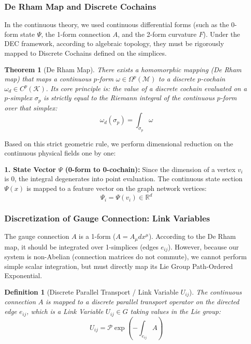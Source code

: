 \documentclass{article}
\newtheorem{definition}{Definition}[section]
\newtheorem{theorem}{Theorem}[section]
\begin{document}
\subsubsection{De Rham Map and Discrete Cochains}

In the continuous theory, we used continuous differential forms (such as the 0-form state $\Psi$, the 1-form connection $A$, and the 2-form curvature $F$). Under the DEC framework, according to algebraic topology, they must be rigorously mapped to Discrete Cochains defined on the simplices.

\begin{theorem}[De Rham Map]
There exists a homomorphic mapping (De Rham map) that maps a continuous $p$-form $\omega \in \Omega^p(\mathcal{M})$ to a discrete $p$-cochain $\omega_d \in C^p(\mathcal{K})$. Its core principle is: the value of a discrete cochain evaluated on a $p$-simplex $\sigma_p$ is strictly equal to the Riemann integral of the continuous $p$-form over that simplex:
\begin{equation}
\omega_d(\sigma_p) = \int_{\sigma_p} \omega
\end{equation}
\end{theorem}

Based on this strict geometric rule, we perform dimensional reduction on the continuous physical fields one by one:

\noindent \textbf{1. State Vector $\Psi$ (0-form to 0-cochain):} 
Since the dimension of a vertex $v_i$ is 0, the integral degenerates into point evaluation. The continuous state section $\Psi(x)$ is mapped to a feature vector on the graph network vertices:
\begin{equation}
\Psi_i = \Psi(v_i) \in \mathbb{R}^d
\end{equation}

\subsubsection{Discretization of Gauge Connection: Link Variables}

The gauge connection $A$ is a 1-form ($A = A_\mu dx^\mu$). According to the De Rham map, it should be integrated over 1-simplices (edges $e_{ij}$). However, because our system is non-Abelian (connection matrices do not commute), we cannot perform simple scalar integration, but must directly map its Lie Group Path-Ordered Exponential.

\begin{definition}[Discrete Parallel Transport / Link Variable $U_{ij}$]
The continuous connection $A$ is mapped to a discrete parallel transport operator on the directed edge $e_{ij}$, which is a Link Variable $U_{ij} \in G$ taking values in the Lie group:
\begin{equation}
U_{ij} = \mathcal{P}\exp \left( -\int_{e_{ij}} A \right)
\end{equation}
\end{definition}
\end{document}
